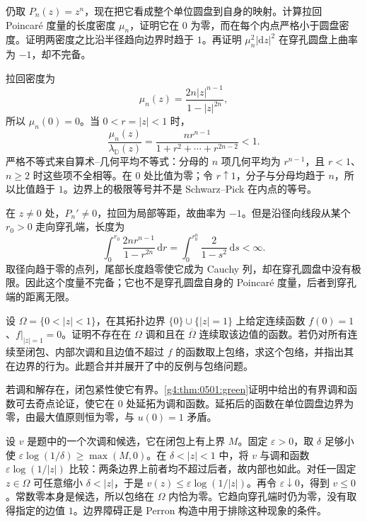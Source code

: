 \begin{exercise}
	\label{g4:ex:0504:branched-density}
	仍取 \(P_n(z)=z^n\)，现在把它看成整个单位圆盘到自身的映射。计算拉回 Poincaré 度量的长度密度 \(\mu_n\)，证明它在 \(0\) 为零，而在每个内点严格小于圆盘密度。证明两密度之比沿半径趋向边界时趋于 \(1\)。再证明 \(\mu_n^2|\mathrm{d}z|^2\) 在穿孔圆盘上曲率为 \(-1\)，却不完备。
\end{exercise}
\begin{solution}
	拉回密度为
	\[
		\mu_n(z)=\frac{2n|z|^{n-1}}{1-|z|^{2n}},
	\]
	所以 \(\mu_n(0)=0\)。当 \(0<r=|z|<1\) 时，
	\[
		\frac{\mu_n(z)}{\lambda_{\mathbb D}(z)}
		=\frac{nr^{n-1}}{1+r^2+\cdots+r^{2n-2}}<1.
	\]
	严格不等式来自算术--几何平均不等式：分母的 \(n\) 项几何平均为 \(r^{n-1}\)，且 \(r<1\)、\(n\ge2\) 时这些项不全相等。在 \(0\) 处比值为零；令 \(r\uparrow1\)，分子与分母均趋于 \(n\)，所以比值趋于 \(1\)。边界上的极限等号并不是 Schwarz--Pick 在内点的等号。

	在 \(z\ne0\) 处，\(P_n'\ne0\)，拉回为局部等距，故曲率为 \(-1\)。但是沿径向线段从某个 \(r_0>0\) 走向穿孔端，长度为
	\[
		\int_0^{r_0}\frac{2nr^{n-1}}{1-r^{2n}}\,\mathrm{d}r
		=\int_0^{r_0^n}\frac2{1-s^2}\,\mathrm{d}s<\infty.
	\]
	取径向趋于零的点列，尾部长度趋零使它成为 Cauchy 列，却在穿孔圆盘中没有极限。因此这个度量不完备；它也不是穿孔圆盘自身的 Poincaré 度量，后者到穿孔端的距离无限。
\end{solution}

\begin{exercise}
	\label{g4:ex:0501:irregular-boundary}
	设 \(\Omega=\{0<|z|<1\}\)，在其拓扑边界 \(\{0\}\cup\{|z|=1\}\) 上给定连续函数 \(f(0)=1\)、\(f|_{|z|=1}=0\)。证明不存在在 \(\Omega\) 调和且在 \(\overline\Omega\) 连续取该边值的函数。若仍对所有连续至闭包、内部次调和且边值不超过 \(f\) 的函数取上包络，求这个包络，并指出其在边界的行为。此题合并并展开了\parencite[第6章第4.2节，第249页及第251页习题]{Ahlfors1979Complex}中的反例与包络问题。
\end{exercise}
\begin{solution}
	若调和解存在，闭包紧性使它有界。\cref{g4:thm:0501:green}证明中给出的有界调和函数可去奇点论证，使它在 \(0\) 处延拓为调和函数。延拓后的函数在单位圆盘边界为零，由最大值原则恒为零，与 \(u(0)=1\) 矛盾。

	设 \(v\) 是题中的一个次调和候选，它在闭包上有上界 \(M\)。固定 \(\varepsilon>0\)，取 \(\delta\) 足够小使 \(\varepsilon\log(1/\delta)\ge\max(M,0)\)。在 \(\delta<|z|<1\) 中，将 \(v\) 与调和函数 \(\varepsilon\log(1/|z|)\) 比较：两条边界上前者均不超过后者，故内部也如此。对任一固定 \(z\in\Omega\) 可任意缩小 \(\delta<|z|\)，于是 \(v(z)\le\varepsilon\log(1/|z|)\)。再令 \(\varepsilon\downarrow0\)，得到 \(v\le0\)。常数零本身是候选，所以包络在 \(\Omega\) 内恰为零。它趋向穿孔端时仍为零，没有取得指定的边值 \(1\)。边界障碍正是 Perron 构造中用于排除这种现象的条件。
\end{solution}

